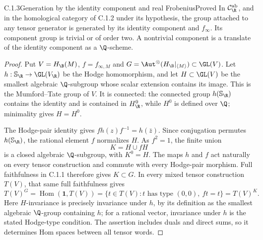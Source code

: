 \begin{result}{C.1.3}{Generation by the identity component and real Frobenius}{Proved}
In $\mathcal C_{\R}^{\mathrm{ab}}$, and in the homological category of C.1.2 under its hypothesis, the group attached to any tensor generator is generated by its identity component and $f_\infty$. Its component group is trivial or of order two. A nontrivial component is a translate of the identity component as a $\Q$-scheme.
\end{result}
\begin{proof}
Put $V=H_{\B}(M)$, $f=f_{\infty,M}$ and
$G=\Aut^\otimes(H_{\B}|_{\langle M\rangle})\subset\GL(V)$.
Let $h:\mathbb S_{\R}\to\GL(V_{\R})$ be the Hodge homomorphism,
and let $H\subset\GL(V)$ be the smallest algebraic $\Q$-subgroup
whose scalar extension contains its image. This is the
Mumford--Tate group of $V$. It is connected: the connected group
$h(\mathbb S_{\R})$ contains the identity and is contained in
$H^0_{\R}$, while $H^0$ is defined over $\Q$; minimality gives
$H=H^0$.

The Hodge-pair identity gives
$fh(z)f^{-1}=h(\bar z)$. Since conjugation permutes
$h(\mathbb S_{\R})$, the rational element $f$ normalizes $H$.
As $f^2=1$, the finite union
\[
                         K=H\cup fH
\]
is a closed algebraic $\Q$-subgroup, with $K^0=H$.
The maps $h$ and $f$ act naturally on every tensor construction
and commute with every Hodge-pair morphism. Full faithfulness
in C.1.1 therefore gives $K\subset G$. In every mixed tensor
construction $T(V)$, that same full faithfulness gives
\[
 T(V)^G=\operatorname{Hom}(\mathbf1,T(V))
       =\{t\in T(V):t\text{ has type }(0,0),\ ft=t\}
       =T(V)^K.                                      \tag{C.1.3a}
\]
Here $H$-invariance is precisely invariance under $h$, by its
definition as the smallest algebraic $\Q$-group containing $h$;
for a rational vector, invariance under $h$ is the stated
Hodge-type condition. The assertion includes duals and direct
sums, so it determines Hom spaces between all tensor words.


\end{proof}
